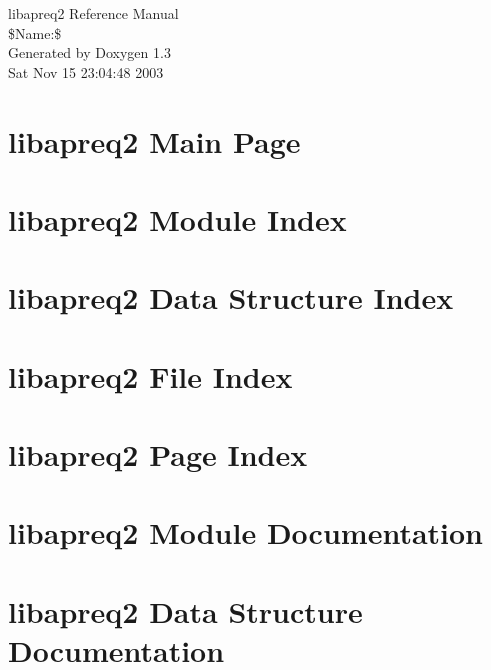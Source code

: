 \documentclass[a4paper]{book}
\begin{document}
\begin{titlepage}
\vspace*{7cm}
\begin{center}
{\Large libapreq2 Reference Manual\\[1ex]\large \$Name:\$}\\
\vspace*{1cm}
{\large Generated by Doxygen 1.3}\\
\vspace*{0.5cm}
{\small Sat Nov 15 23:04:48 2003}\\
\end{center}
\end{titlepage}
\clearemptydoublepage
{}
\tableofcontents
\clearemptydoublepage
{}
\chapter{libapreq2 Main Page}
\label{index}
\chapter{libapreq2 Module Index}

\chapter{libapreq2 Data Structure Index}

\chapter{libapreq2 File Index}

\chapter{libapreq2 Page Index}

\chapter{libapreq2 Module Documentation}

















\chapter{libapreq2 Data Structure Documentation}








\end{document}
